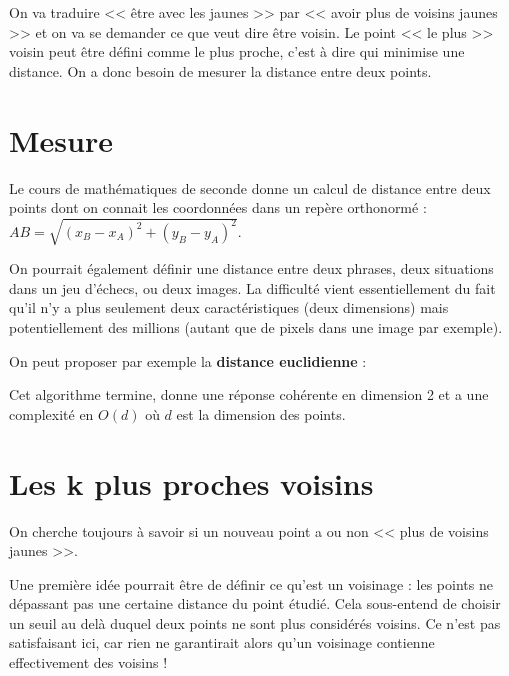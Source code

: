 On va traduire << être avec les jaunes >> par << avoir plus de voisins jaunes >> et on va se demander ce que veut dire être voisin. Le point << le plus >> voisin peut être défini comme le plus proche, c'est à dire qui minimise une distance. On a donc besoin de mesurer la distance entre deux points.

\section{Mesure}

Le cours de mathématiques de seconde donne un calcul de distance entre deux points dont on connait les coordonnées dans un repère orthonormé : $AB = \sqrt{(x_B - x_A)^2+(y_B-y_A)^2}$.

On pourrait également définir une distance entre deux phrases, deux situations dans un jeu d'échecs, ou deux images. La difficulté vient essentiellement du fait qu'il n'y a plus seulement deux caractéristiques (deux dimensions) mais potentiellement des millions (autant que de pixels dans une image par exemple). 

On peut proposer par exemple la {\bfseries distance euclidienne} :

\begin{algorithm}[H]
\end{algorithm}

Cet algorithme termine, donne une réponse cohérente en dimension 2 et a une complexité en $O(d)$ où $d$ est la dimension des points.






\section{Les k plus proches voisins}

On cherche toujours à savoir si un nouveau point a ou non << plus de voisins jaunes >>. 

Une première idée pourrait être de définir ce qu'est un voisinage : les points ne dépassant pas une certaine distance du point étudié. Cela sous-entend de choisir un seuil au delà duquel deux points ne sont plus considérés voisins. Ce n'est pas satisfaisant ici, car rien ne garantirait alors qu'un voisinage contienne effectivement des voisins !

